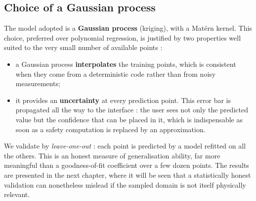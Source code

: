 \subsection{Choice of a Gaussian process}

The model adopted is a \textbf{Gaussian process} (kriging), with a Matérn
kernel. This choice, preferred over polynomial regression, is justified by two
properties well suited to the very small number of available points :

\begin{itemize}
  \item a Gaussian process \textbf{interpolates} the training points, which is
    consistent when they come from a deterministic code rather than from noisy
    measurements;
  \item it provides an \textbf{uncertainty} at every prediction point. This
    error bar is propagated all the way to the interface : the user sees not only
    the predicted value but the confidence that can be placed in it, which is
    indispensable as soon as a safety computation is replaced by an
    approximation.
\end{itemize}

We validate by \textit{leave-one-out} : each point is predicted by
a model refitted on all the others. This is an honest measure of generalisation
ability, far more meaningful than a goodness-of-fit coefficient over a few dozen
points. The results are presented in the next chapter, where it will be seen
that a statistically honest validation can nonetheless mislead if the sampled
domain is not itself physically relevant.

\clearpage

\clearpage
